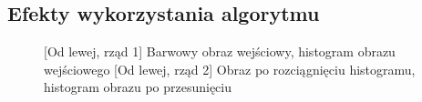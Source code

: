 \documentclass[a4paper,12pt, titlepage]{report}
\begin{document}
\subsection*{Efekty wykorzystania algorytmu}
\begin{figure}[h]
    \centering
    \qquad
    \caption{[Od lewej, rząd 1] Barwowy obraz wejściowy, histogram obrazu wejściowego [Od lewej, rząd 2] Obraz po rozciągnięciu histogramu, histogram obrazu po przesunięciu}%
    \label{fig:rysunek}%
\end{figure}
\end{document}
